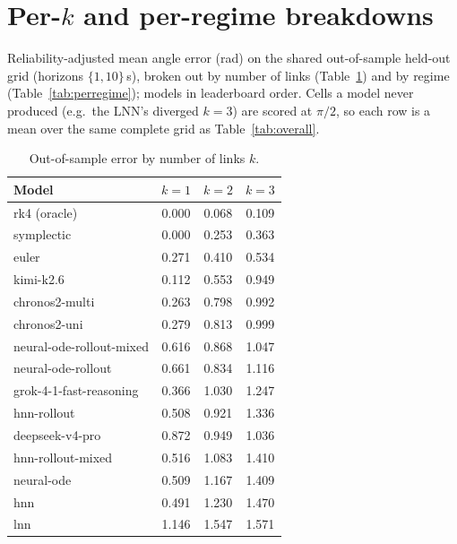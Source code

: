 \documentclass{article}
\begin{document}
\section{Per-$k$ and per-regime breakdowns}
\label{app:breakdown}
Reliability-adjusted mean angle error (rad) on the shared out-of-sample held-out grid
(horizons $\{1,10\}$\,s), broken out by number of links (Table~\ref{tab:perk}) and by
regime (Table~\ref{tab:perregime}); models in leaderboard order. Cells a model never
produced (e.g.\ the LNN's diverged $k{=}3$) are scored at $\pi/2$, so each row is a mean
over the same complete grid as Table~\ref{tab:overall}.

\begin{table}[h]
\centering\small
\caption{Out-of-sample error by number of links $k$.}
\label{tab:perk}
\begin{tabular}{lccc}
\toprule
Model & $k{=}1$ & $k{=}2$ & $k{=}3$ \\
\midrule
rk4 (oracle) & 0.000 & 0.068 & 0.109 \\
symplectic & 0.000 & 0.253 & 0.363 \\
euler & 0.271 & 0.410 & 0.534 \\
kimi-k2.6 & 0.112 & 0.553 & 0.949 \\
chronos2-multi & 0.263 & 0.798 & 0.992 \\
chronos2-uni & 0.279 & 0.813 & 0.999 \\
neural-ode-rollout-mixed & 0.616 & 0.868 & 1.047 \\
neural-ode-rollout & 0.661 & 0.834 & 1.116 \\
grok-4-1-fast-reasoning & 0.366 & 1.030 & 1.247 \\
hnn-rollout & 0.508 & 0.921 & 1.336 \\
deepseek-v4-pro & 0.872 & 0.949 & 1.036 \\
hnn-rollout-mixed & 0.516 & 1.083 & 1.410 \\
neural-ode & 0.509 & 1.167 & 1.409 \\
hnn & 0.491 & 1.230 & 1.470 \\
lnn & 1.146 & 1.547 & 1.571 \\
\bottomrule
\end{tabular}
\end{table}
\end{document}
